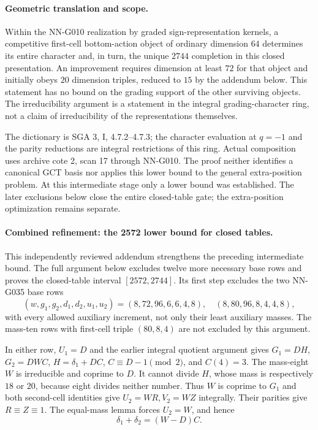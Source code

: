 \paragraph{Geometric translation and scope.}
Within the NN-G010 realization by graded sign-representation
kernels, a competitive first-cell bottom-action object
of ordinary dimension $64$ determines its entire character
and, in turn, the unique $2744$ completion in this closed
presentation. An improvement requires dimension at least
$72$ for that object and initially obeys $20$
dimension triples, reduced to $15$ by the addendum below. This statement has no bound on the
grading support of the other surviving objects.
The irreducibility argument is a statement in the
integral grading-character ring, not a claim of
irreducibility of the representations themselves.

The dictionary is SGA 3, I, 4.7.2--4.7.3; the character
evaluation at $q=-1$ and the parity reductions are
integral restrictions of this ring. Actual composition
uses archive cote 2, scan 17 through NN-G010.
The proof neither identifies a canonical GCT basis nor
applies this lower bound to the general extra-position
problem. At this intermediate stage only a lower bound was established.
The later exclusions below close the entire closed-table gate;
the extra-position optimization remains separate.


\paragraph{Combined refinement: the 2572 lower bound for closed tables.}
This independently reviewed addendum strengthens the
preceding intermediate bound. The full argument below
excludes twelve more necessary base rows and proves the
closed-table interval $[2572,2744]$.
Its first step excludes the two
NN-G035 base rows
\[
 (w,g_1,g_2,d_1,d_2,u_1,u_2)
   =(8,72,96,6,6,4,8),\quad(8,80,96,8,4,4,8),
\]
with every allowed auxiliary increment, not only their
least auxiliary masses. The mass-ten rows with first-cell
triple $(80,8,4)$ are not excluded by this argument.

In either row, $U_1=D$ and the earlier integral quotient
argument gives $G_1=DH$, $G_2=DWC$,
$H=\delta_1+DC$, $C\equiv D-1\pmod2$, and $C(4)=3$.
The mass-eight $W$ is irreducible and coprime to $D$.
It cannot divide $H$, whose mass is respectively $18$
or $20$, because eight divides neither number.
Thus $W$ is coprime to $G_1$ and both second-cell
identities give $U_2=WR,V_2=WZ$ integrally.
Their parities give $R\equiv Z\equiv1$.
The equal-mass lemma forces $U_2=W$, and hence
\[
             \delta_1+\delta_2=(W-D)C.               \tag{G036.R1}
\]

